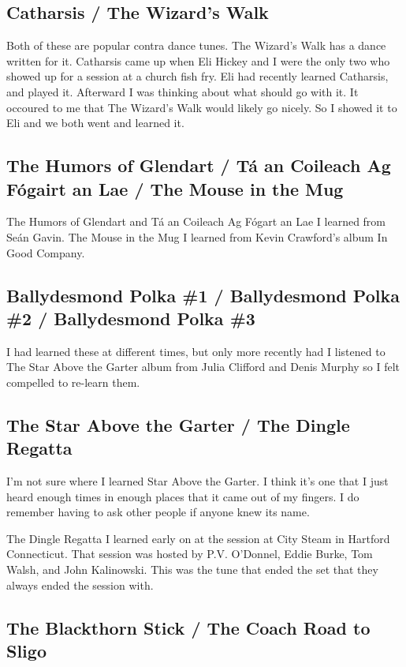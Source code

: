 \documentclass[9pt,letterpaper]{article}
\begin{document}
{\subsection{Catharsis / The Wizard's Walk}

Both of these are popular contra dance tunes. The Wizard's Walk has a dance written for it. Catharsis came up when Eli Hickey and I were the only two who showed up for a session at a church fish fry. Eli had recently learned Catharsis, and played it. Afterward I was thinking about what should go with it. It occoured to me that The Wizard's Walk would likely go nicely. So I showed it to Eli and we both went and learned it.

\subsection{The Humors of Glendart / T\'a an Coileach Ag F\'ogairt an Lae / The Mouse in the Mug}

The Humors of Glendart and T\'a an Coileach Ag F\'ogart an Lae I learned from Se\'an Gavin. The Mouse in the Mug I learned from Kevin Crawford's album In Good Company.

\subsection{Ballydesmond Polka \#1 / Ballydesmond Polka \#2 / Ballydesmond Polka \#3}

I had learned these at different times, but only more recently had I listened to The Star Above the Garter album from Julia Clifford and Denis Murphy so I felt compelled to re-learn them.

\subsection{The Star Above the Garter / The Dingle Regatta}

I'm not sure where I learned Star Above the Garter. I think it's one that I just heard enough times in enough places that it came out of my fingers. I do remember having to ask other people if anyone knew its name.

The Dingle Regatta I learned early on at the session at City Steam in Hartford Connecticut. That session was hosted by P.V. O'Donnel, Eddie Burke, Tom Walsh, and John Kalinowski. This was the tune that ended the set that they always ended the session with.

\subsection{The Blackthorn Stick / The Coach Road to Sligo}

}
\end{document}
